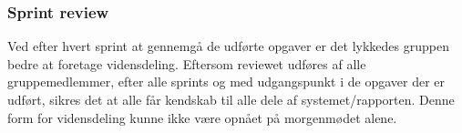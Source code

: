 \subsubsection{Sprint review}
Ved efter hvert sprint at gennemgå de udførte opgaver er det lykkedes gruppen bedre at foretage vidensdeling.
Eftersom reviewet udføres af alle gruppemedlemmer, efter alle sprints og med udgangspunkt i de opgaver der er udført, sikres det at alle får kendskab til alle dele af systemet/rapporten.
Denne form for vidensdeling kunne ikke være opnået på morgenmødet alene.
%
%

